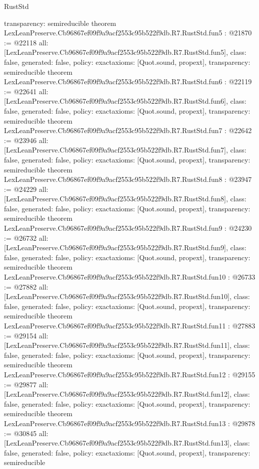 \begin{lexlean}{RustStd}
\begin{coremodule}
{  transparency: semireducible
}
theorem LexLeanPreserve.Cb96867ef09f9a9acf2553c95b522f9db.R7.RustStd.fun5 : @21870 := @22118 {
  all: [LexLeanPreserve.Cb96867ef09f9a9acf2553c95b522f9db.R7.RustStd.fun5],
  class: false,
  generated: false,
  policy: exact{axioms: [Quot.sound, propext]},
  transparency: semireducible
}
theorem LexLeanPreserve.Cb96867ef09f9a9acf2553c95b522f9db.R7.RustStd.fun6 : @22119 := @22641 {
  all: [LexLeanPreserve.Cb96867ef09f9a9acf2553c95b522f9db.R7.RustStd.fun6],
  class: false,
  generated: false,
  policy: exact{axioms: [Quot.sound, propext]},
  transparency: semireducible
}
theorem LexLeanPreserve.Cb96867ef09f9a9acf2553c95b522f9db.R7.RustStd.fun7 : @22642 := @23946 {
  all: [LexLeanPreserve.Cb96867ef09f9a9acf2553c95b522f9db.R7.RustStd.fun7],
  class: false,
  generated: false,
  policy: exact{axioms: [Quot.sound, propext]},
  transparency: semireducible
}
theorem LexLeanPreserve.Cb96867ef09f9a9acf2553c95b522f9db.R7.RustStd.fun8 : @23947 := @24229 {
  all: [LexLeanPreserve.Cb96867ef09f9a9acf2553c95b522f9db.R7.RustStd.fun8],
  class: false,
  generated: false,
  policy: exact{axioms: [Quot.sound, propext]},
  transparency: semireducible
}
theorem LexLeanPreserve.Cb96867ef09f9a9acf2553c95b522f9db.R7.RustStd.fun9 : @24230 := @26732 {
  all: [LexLeanPreserve.Cb96867ef09f9a9acf2553c95b522f9db.R7.RustStd.fun9],
  class: false,
  generated: false,
  policy: exact{axioms: [Quot.sound, propext]},
  transparency: semireducible
}
theorem LexLeanPreserve.Cb96867ef09f9a9acf2553c95b522f9db.R7.RustStd.fun10 : @26733 := @27882 {
  all: [LexLeanPreserve.Cb96867ef09f9a9acf2553c95b522f9db.R7.RustStd.fun10],
  class: false,
  generated: false,
  policy: exact{axioms: [Quot.sound, propext]},
  transparency: semireducible
}
theorem LexLeanPreserve.Cb96867ef09f9a9acf2553c95b522f9db.R7.RustStd.fun11 : @27883 := @29154 {
  all: [LexLeanPreserve.Cb96867ef09f9a9acf2553c95b522f9db.R7.RustStd.fun11],
  class: false,
  generated: false,
  policy: exact{axioms: [Quot.sound, propext]},
  transparency: semireducible
}
theorem LexLeanPreserve.Cb96867ef09f9a9acf2553c95b522f9db.R7.RustStd.fun12 : @29155 := @29877 {
  all: [LexLeanPreserve.Cb96867ef09f9a9acf2553c95b522f9db.R7.RustStd.fun12],
  class: false,
  generated: false,
  policy: exact{axioms: [Quot.sound, propext]},
  transparency: semireducible
}
theorem LexLeanPreserve.Cb96867ef09f9a9acf2553c95b522f9db.R7.RustStd.fun13 : @29878 := @30845 {
  all: [LexLeanPreserve.Cb96867ef09f9a9acf2553c95b522f9db.R7.RustStd.fun13],
  class: false,
  generated: false,
  policy: exact{axioms: [Quot.sound, propext]},
  transparency: semireducible
}
\end{coremodule}
\end{lexlean}
